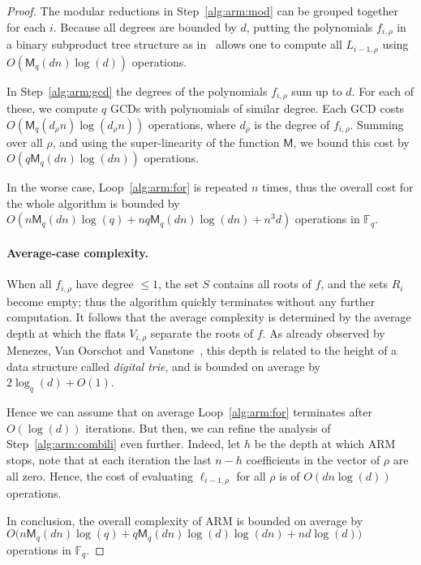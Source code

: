 \documentclass{article}
\newcommand{\ff}[1]{\mathbb{F}_{#1}}
\newcommand{\qq}{q}
\newcommand{\basef}{\ff{\qq}}
\newcommand{\Mul}{\mathsf{M}}
\newcounter{algo}
\begin{document}
\begin{proof}
  The modular reductions in Step~\ref{alg:arm:mod} can be grouped
  together for each $i$. %
  Because all degrees are bounded by $d$, putting the polynomials
  $f_{i,\rho}$ in a binary subproduct tree structure as
  in~\cite[Lemma~10.4]{Gathen2003} allows one to compute all
  $L_{i-1,\rho}$ using $O(\Mul_q(dn)\log(d))$ operations.

  In Step~\ref{alg:arm:gcd} the degrees of the polynomials
  $f_{i,\rho}$ sum up to $d$. %
  For each of these, we compute $q$ GCDs with polynomials of similar
  degree. %
  Each GCD costs $O(\Mul_q(d_\rho n)\log(d_\rho n))$ operations, where
  $d_\rho$ is the degree of $f_{i,\rho}$. %
  Summing over all $\rho$, and using the super-linearity of the
  function $\Mul$, we bound this cost by $O(q\Mul_q(dn)\log(dn))$
  operations.

  In the worse case, Loop~\ref{alg:arm:for} is repeated $n$ times,
  thus the overall cost for the whole algorithm is bounded by
  $O(n\Mul_q(dn)\log(q) + nq\Mul_q(dn)\log(dn) + n^3d)$ operations in
  $\basef$.

  \paragraph{Average-case complexity.} When all $f_{i,\rho}$ have
  degree $\le 1$, the set $S$ contains all roots of $f$, and the sets
  $R_i$ become empty; thus the algorithm quickly terminates without
  any further computation. %
  It follows that the average complexity is determined by the average
  depth at which the flats $V_{i,\rho}$ separate the roots of $f$. %
  As already observed by Menezes, Van Oorschot and
  Vanstone~\cite[Theorem~7]{Menvanovans92}, this depth is related to
  the height of a data structure called \emph{digital trie}, and is
  bounded on average by $2\log_q(d) + O(1)$.

  Hence we can assume that on average Loop~\ref{alg:arm:for}
  terminates after $O(\log(d))$ iterations. %
  But then, we can refine the analysis of Step~\ref{alg:arm:combili}
  even further. %
  Indeed, let $h$ be the depth at which ARM stops, note that at each
  iteration the last $n-h$ coefficients in the vector of $\rho$ are
  all zero. %
  Hence, the cost of evaluating $\ell_{i-1,\rho}$ for all $\rho$ is
  of $O(dn\log(d))$ operations.

  In conclusion, the overall complexity of ARM is bounded on average
  by
  $O\bigl(n\Mul_q(dn)\log(q) + q\Mul_q(dn)\log(d)\log(dn) +
  nd\log(d)\bigr)$ operations in $\basef$.
\end{proof}
\end{document}
